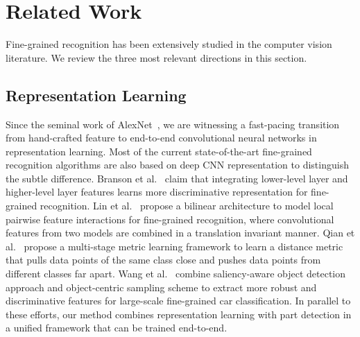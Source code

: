 \documentclass[10pt,twocolumn,letterpaper]{article}
\begin{document}

\section{Related Work}
Fine-grained recognition has been extensively studied in the computer vision literature.
We review the three most relevant directions in this section.

\subsection{Representation Learning}
Since the seminal work of AlexNet~\cite{KrizhevskySH12}, we are witnessing a fast-pacing transition from hand-crafted feature to end-to-end convolutional neural networks in representation learning.
Most of the current state-of-the-art fine-grained recognition algorithms are also based on deep CNN representation to distinguish the subtle difference.
Branson et al.~\cite{bd15} claim that integrating lower-level layer and higher-level layer features learns more discriminative representation for fine-grained recognition.
Lin et al.~\cite{bd16} propose a bilinear architecture to model local pairwise feature interactions for fine-grained recognition, where convolutional features from two models are combined in a translation invariant manner.
Qian et al.~\cite{bd17} propose a multi-stage metric learning framework to learn a distance metric that pulls data points of the same class close and pushes data points from different classes far apart.
Wang et al.~\cite{bd19} combine saliency-aware object detection approach and object-centric sampling scheme to extract more robust and discriminative features for large-scale fine-grained car classification.
In parallel to these efforts, our method combines representation learning with part detection in a unified framework that can be trained end-to-end.
\end{document}
